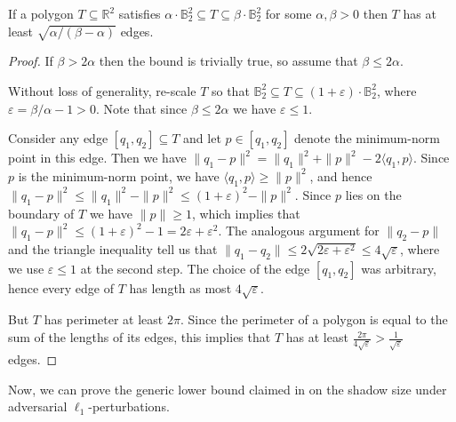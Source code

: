 \documentclass{theoretics}
\newcommand{\R}{\mathbb R}
\newcommand{\eps}{\varepsilon} %
\newcommand{\ball}{\mathbb{B}_2}
\renewcommand{\subset}{\subseteq}
\begin{document}
\begin{lemma}\label{lem:edgecount}
If a polygon $T \subset \R^2$ satisfies $\alpha\cdot \ball^2 \subset T \subset \beta\cdot \ball^2$
for some $\alpha, \beta > 0$ then $T$ has at least $\sqrt{\alpha/(\beta - \alpha)}$ edges.
\end{lemma}
\begin{proof}
If $\beta > 2\alpha$ then the bound is trivially true,
so assume that $\beta \leq 2\alpha$.

Without loss of generality, re-scale $T$ so that $\ball^2 \subset T \subset (1+\eps)\cdot \ball^2$,
where $\eps = \beta/\alpha - 1 > 0$. Note that since $\beta \leq 2 \alpha$ we have $\eps \leq 1$.

Consider any edge $[q_1, q_2] \subset T$ and let $p \in [q_1,q_2]$ denote
the minimum-norm point in this edge.
Then we have $\|q_1 - p\|^2 = \|q_1\|^2 + \|p\|^2 - 2\langle q_1,p\rangle$.
Since $p$ is the minimum-norm point, we have $\langle q_1, p \rangle \geq \|p\|^2$,
and hence $\|q_1 - p\|^2 \leq \|q_1\|^2 - \|p\|^2 \leq (1+\eps)^2 - \|p\|^2$.
Since $p$ lies on the boundary of $T$ we have $\|p\| \geq 1$,
which implies that $\|q_1-p\|^2 \leq (1+\eps)^2 - 1 = 2\eps + \eps^2$.
The analogous argument for $\|q_2-p\|$ and the triangle inequality tell us that
$\|q_1-q_2\| \leq 2\sqrt{2\eps + \eps^2} \leq 4\sqrt{\eps}$, where we use $\eps \leq 1$ at the second step. The choice of the edge $[q_1,q_2]$ was
arbitrary, hence every edge of $T$ has length as most $4\sqrt{\eps}$.

But $T$ has perimeter at least $2\pi$. Since the perimeter of a polygon
is equal to the sum of the lengths of its edges, this implies that
$T$ has at least $\frac{2\pi}{4\sqrt{\eps}} > \frac{1}{\sqrt \eps}$ edges.
\end{proof}

Now, we can prove the generic lower bound claimed in  on the shadow size
under adversarial $\ell_1$-perturbations.
\end{document}
